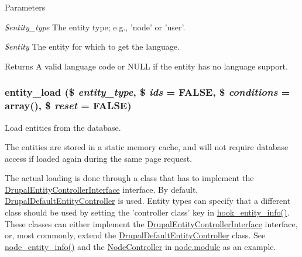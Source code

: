 \begin{DoxyParams}{Parameters}
\item[{\em \$entity\_\-type}]The entity type; e.g., 'node' or 'user'. \item[{\em \$entity}]The entity for which to get the language.\end{DoxyParams}
\begin{DoxyReturn}{Returns}
A valid language code or NULL if the entity has no language support. 
\end{DoxyReturn}
\hypertarget{common_8inc_a78b89cf93f9710a68d02f86adccf1898}{
\subsubsection[{entity\_\-load}]{\setlength{\rightskip}{0pt plus 5cm}entity\_\-load (\$ {\em entity\_\-type}, \/  \$ {\em ids} = {\ttfamily FALSE}, \/  \$ {\em conditions} = {\ttfamily array()}, \/  \$ {\em reset} = {\ttfamily FALSE})}}
\label{common_8inc_a78b89cf93f9710a68d02f86adccf1898}
Load entities from the database.

The entities are stored in a static memory cache, and will not require database access if loaded again during the same page request.

The actual loading is done through a class that has to implement the \hyperlink{interfaceDrupalEntityControllerInterface}{DrupalEntityControllerInterface} interface. By default, \hyperlink{classDrupalDefaultEntityController}{DrupalDefaultEntityController} is used. Entity types can specify that a different class should be used by setting the 'controller class' key in \hyperlink{group__hooks_gaf02318e9d0e8cdbf6d187b271b9969a8}{hook\_\-entity\_\-info()}. These classes can either implement the \hyperlink{interfaceDrupalEntityControllerInterface}{DrupalEntityControllerInterface} interface, or, most commonly, extend the \hyperlink{classDrupalDefaultEntityController}{DrupalDefaultEntityController} class. See \hyperlink{node_8module_aaf9f722394e2a25a4bd17e53d9923bfa}{node\_\-entity\_\-info()} and the \hyperlink{classNodeController}{NodeController} in \hyperlink{node_8module}{node.module} as an example.


